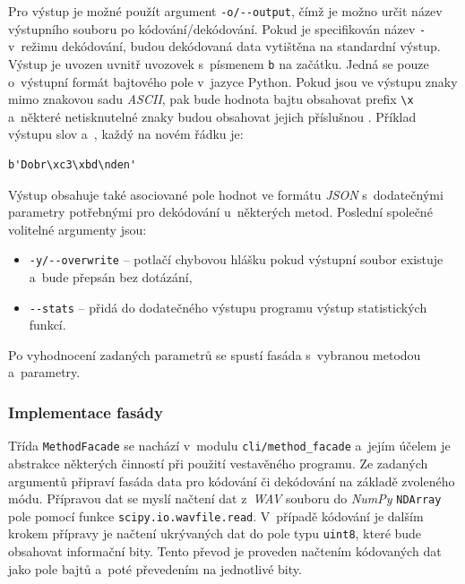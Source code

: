 Pro výstup je možné použít argument \verb|-o/--output|, čímž je možno určit
název výstupního souboru po kódování/dekódování. Pokud je specifikován název
\texttt{-} v~režimu dekódování, budou dekódovaná data vytištěna na standardní
výstup. Výstup je uvozen uvnitř uvozovek s~písmenem \texttt{b} na začátku.
Jedná se pouze o~výstupní formát bajtového pole v~jazyce Python. Pokud jsou ve
výstupu znaky mimo znakovou sadu \textit{ASCII}, pak bude hodnota bajtu
obsahovat prefix \verb|\x| a~některé netisknutelné znaky budou obsahovat jejich
příslušnou . Příklad výstupu slov  a~,
každý na novém řádku je:

\begin{verbatim}
b'Dobr\xc3\xbd\nden'
\end{verbatim}

Výstup obsahuje také asociované pole hodnot ve formátu \textit{JSON}
s~dodatečnými parametry potřebnými pro dekódování u~některých metod. Poslední
společné volitelné argumenty jsou:

\begin{itemize}
    \item \verb|-y/--overwrite| -- potlačí chybovou hlášku pokud výstupní
        soubor existuje a~bude přepsán bez dotázání,
    \item \verb|--stats| -- přidá do dodatečného výstupu programu výstup
        statistických funkcí.
\end{itemize}

Po vyhodnocení zadaných parametrů se spustí fasáda s~vybranou metodou
a~parametry.

\subsubsection*{Implementace fasády}
\label{ssub:facade-implementation}

Třída \texttt{MethodFacade} se nachází v~modulu \texttt{cli/method\_facade}
a~jejím účelem je abstrakce některých činností při použití vestavěného
programu. Ze zadaných argumentů připraví fasáda data pro kódování či dekódování
na základě zvoleného módu. Přípravou dat se myslí načtení dat z~\textit{WAV}
souboru do \textit{NumPy} \texttt{NDArray} pole pomocí funkce
\texttt{scipy.io.wavfile.read}. V~případě kódování je dalším krokem přípravy je
načtení ukrývaných dat do pole typu \texttt{uint8}, které bude obsahovat
informační bity. Tento převod je proveden načtením kódovaných dat jako pole
bajtů a~poté převedením na jednotlivé bity.

